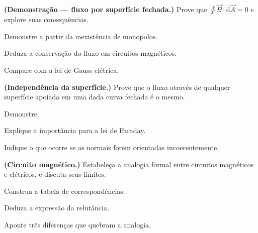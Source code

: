 \blocodesafio
\begin{questao}[4]{}

\textbf{(Demonstração --- fluxo por superfície fechada.)} Prove que
$\oint\vec B\cdot\mathrm{d}\vec A=0$ e explore suas consequências.
\begin{itensq}
\item Demonstre a partir da inexistência de monopolos.
\item Deduza a conservação do fluxo em circuitos magnéticos.
\item Compare com a lei de Gauss elétrica.
\end{itensq}


\end{questao}
\begin{questao}[4]{}

\textbf{(Independência da superfície.)} Prove que o fluxo através de qualquer
superfície apoiada em uma dada curva fechada é o mesmo.
\begin{itensq}
\item Demonstre.
\item Explique a importância para a lei de Faraday.
\item Indique o que ocorre se as normais forem orientadas incoerentemente.
\end{itensq}


\end{questao}
\begin{questao}[4]{}

\textbf{(Circuito magnético.)} Estabeleça a analogia formal entre circuitos
magnéticos e elétricos, e discuta seus limites.
\begin{itensq}
\item Construa a tabela de correspondências.
\item Deduza a expressão da relutância.
\item Aponte três diferenças que quebram a analogia.
\end{itensq}


\end{questao}
